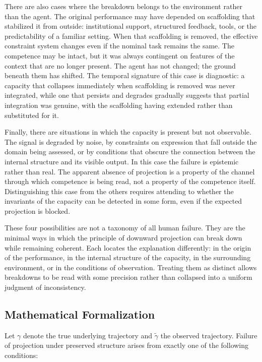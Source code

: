 \documentclass[12pt, a4paper]{article}
\begin{document}
There are also cases where the breakdown belongs to the environment rather than the agent. The original performance may have depended on scaffolding that stabilized it from outside: institutional support, structured feedback, tools, or the predictability of a familiar setting. When that scaffolding is removed, the effective constraint system changes even if the nominal task remains the same. The competence may be intact, but it was always contingent on features of the context that are no longer present. The agent has not changed; the ground beneath them has shifted. The temporal signature of this case is diagnostic: a capacity that collapses immediately when scaffolding is removed was never integrated, while one that persists and degrades gradually suggests that partial integration was genuine, with the scaffolding having extended rather than substituted for it.

Finally, there are situations in which the capacity is present but not observable. The signal is degraded by noise, by constraints on expression that fall outside the domain being assessed, or by conditions that obscure the connection between the internal structure and its visible output. In this case the failure is epistemic rather than real. The apparent absence of projection is a property of the channel through which competence is being read, not a property of the competence itself. Distinguishing this case from the others requires attending to whether the invariants of the capacity can be detected in some form, even if the expected projection is blocked.

These four possibilities are not a taxonomy of all human failure. They are the minimal ways in which the principle of downward projection can break down while remaining coherent. Each locates the explanation differently: in the origin of the performance, in the internal structure of the capacity, in the surrounding environment, or in the conditions of observation. Treating them as distinct allows breakdowns to be read with some precision rather than collapsed into a uniform judgment of inconsistency.

\subsection*{Mathematical Formalization}

Let $\gamma$ denote the true underlying trajectory and $\tilde{\gamma}$ the observed trajectory. Failure of projection under preserved structure arises from exactly one of the following conditions:
\end{document}
